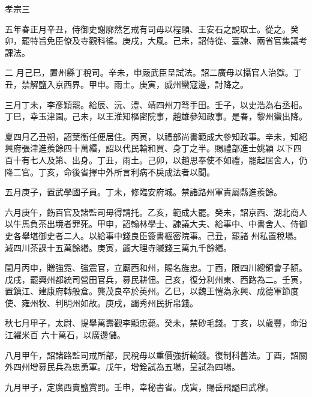 
\begin{pinyinscope}

 孝宗三



 五年春正月辛丑，侍御史謝廓然乞戒有司毋以程頤、王安石之說取士。從之。癸卯，罷特旨免臣僚及寺觀科徭。庚戌，大風。己未，詔侍從、臺諫、兩省官集議考課法。



 二
 月己巳，置州縣丁稅司。辛未，申嚴武臣呈試法。詔二廣毋以攝官人治獄。丁丑，禁解鹽入京西界。甲申。雨土。庚寅，威州蠻寇邊，討降之。



 三月丁未，李彥穎罷。給辰、沅、澧、靖四州刀弩手田。壬子，以史浩為右丞相。丁巳，幸玉津園。己未，以王淮知樞密院事，趙雄參知政事。是春，黎州蠻出降。



 夏四月乙丑朔，詔葉衡任便居住。丙寅，以禮部尚書範成大參知政事。辛未，知紹興府張津進羨餘四十萬緡，詔以代民輸和買、身丁之半。賜禮部進士姚穎
 以下四百十有七人及第、出身。丁丑，雨土。己卯，以趙思奉使不如禮，罷起居舍人，仍降二官。丁亥，命後省擇中外所言利病不戾成法者以聞。



 五月庚子，置武學國子員。丁未，修臨安府城。禁諸路州軍責屬縣進羨餘。



 六月庚午，飭百官及諸監司毋得請托。乙亥，範成大罷。癸未，詔京西、湖北商人以牛馬負茶出境者罪死。甲申，詔翰林學士、諫議大夫、給事中、中書舍人、侍御史各舉堪御史者二人。以給事中錢良臣簽書樞密院事。己丑，罷諸
 州私置稅場。減四川茶課十五萬餘緡。庚寅，蠲大理寺贓錢三萬九千餘緡。



 閏月丙申，贈強霓、強震官，立廟西和州，賜名旌忠。丁酉，限四川總領會子額。戊戌，罷興州都統司營田官兵，募民耕佃。己亥，復分利州東、西路為二。壬寅，置鎮江、建康府轉般倉。龔茂良卒於英州。乙巳，以魏王愷為永興、成德軍節度使、雍州牧、判明州如故。庚戌，蠲秀州民折帛錢。



 秋七月甲子，太尉、提舉萬壽觀李顯忠薨。癸未，禁砂毛錢。丁亥，以歲豐，命沿江糴米百
 六十萬石，以廣邊儲。



 八月甲午，詔諸路監司戒所部，民稅毋以重價強折輸錢。復制科舊法。丁酉，詔關外四州增募民兵為忠勇軍。戊午，增銓試為五場，呈試為四場。



 九月甲子，定廣西賣鹽賞罰。壬申，幸秘書省。戊寅，賜岳飛謚曰武穆。




\end{pinyinscope}

